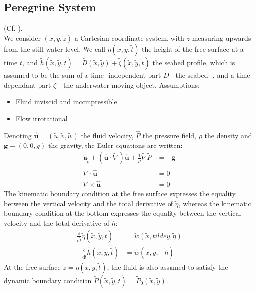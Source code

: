 \documentclass[11pt,a4paper]{article}
\begin{document}
		\subsection{Peregrine System}
			(Cf. \cite{DM2013}).\\ We consider $(\tilde{x},\tilde{y},\tilde{z})$ a Cartesian 
			coordinate system, with $\tilde{z}$ measuring upwards from the still water 
			level. We call $\tilde{\eta}(\tilde{x},\tilde{y},\tilde{t})$ the height of the 
			free surface at a time $\tilde{t}$, and $\tilde{h}(\tilde{x},\tilde{y},
			\tilde{t}) = \tilde{D}(\tilde{x},\tilde{y}) + \tilde{\zeta}(\tilde{x},\tilde{y},
			\tilde{t})$ the seabed profile, which is assumed to be the sum of a time-
			independent part $\tilde{D}$ - the seabed -, and a time-dependant part 
			$\tilde{\zeta}$ - the underwater moving object.
			Assumptions:
			\begin{itemize}
				\item Fluid inviscid and incompressible
				\item Flow irrotational
			\end{itemize}
			Denoting $\mathbf{\hat{u}} = (\tilde{u},\tilde{v}, \tilde{w})$ the fluid 
			velocity, $\hat{P}$ the pressure field, $\rho$ the density and $\mathbf{g} = 
			(0,0,g)$ the gravity, the Euler equations are written: 
			\begin{align}
						\displaystyle \mathbf{\hat{u}}_{\tilde{t}} + (\mathbf{\hat{u}} \cdot \tilde{\nabla}) \mathbf{\hat{u}} + \frac{1}{\rho} \tilde{\nabla}\tilde{P} &=  -\mathbf{g} \label{Euler1} \\
						\tilde{\nabla} \cdot \mathbf{\hat{u}} & = 0 \\
						\tilde{\nabla} \times \mathbf{\hat{u}} & = 0 \label{Euler3}
			\end{align}
			The kinematic boundary condition at the free surface expresses the equality between the vertical velocity and the total derivative of $\tilde{\eta}$, whereas the kinematic boundary condition at the bottom expresses the equality between the vertical velocity and the total derivative of $\tilde{h}$:
			\begin{align}
				\frac{\mathrm{d}}{\mathrm{d}\tilde{t}} \tilde{\eta}(\tilde{x},\tilde{y},\tilde{t}) & = \tilde{w}(\tilde{x},tilde{y},\tilde{\eta}) \label{BC1} \\
				-\frac{\mathrm{d}}{\mathrm{d}\tilde{t}} \tilde{h}(\tilde{x},\tilde{y},\tilde{t}) & = \tilde{w}(\tilde{x},\tilde{y},-\tilde{h}) \label{BC2}
			\end{align}
			At the free surface $\tilde{z} = \tilde{\eta}(\tilde{x},\tilde{y},\tilde{t})$,	the fluid is also assumed to satisfy the dynamic boundary condition $\tilde{P}(\tilde{x},\tilde{y},\tilde{t}) = \tilde{P}_0(\tilde{x},\tilde{y})$.
			
\end{document}
